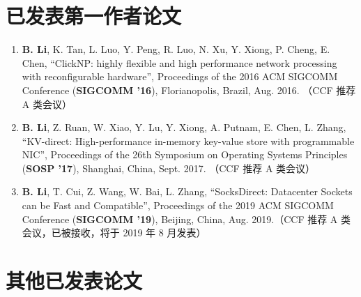 
\begin{publications}

\section*{已发表第一作者论文}

\begin{enumerate}
\item \textbf{B. Li}, K. Tan, L. Luo, Y. Peng, R. Luo, N. Xu, Y. Xiong, P. Cheng, E. Chen, ``ClickNP: highly flexible and high performance network processing with reconfigurable hardware'', Proceedings of the 2016 ACM SIGCOMM Conference (\textbf{SIGCOMM '16}), Florianopolis, Brazil, Aug. 2016. （CCF 推荐 A 类会议）
\item \textbf{B. Li}, Z. Ruan, W. Xiao, Y. Lu, Y. Xiong, A. Putnam, E. Chen, L. Zhang, ``KV-direct: High-performance in-memory key-value store with programmable NIC'', Proceedings of the 26th Symposium on Operating Systems Principles (\textbf{SOSP '17}), Shanghai, China, Sept. 2017. （CCF 推荐 A 类会议）
\item \textbf{B. Li}, T. Cui, Z. Wang, W. Bai, L. Zhang, ``SocksDirect: Datacenter Sockets can be Fast and Compatible'', Proceedings of the 2019 ACM SIGCOMM Conference (\textbf{SIGCOMM '19}), Beijing, China, Aug. 2019.（CCF 推荐 A 类会议，已被接收，将于 2019 年 8 月发表）
\end{enumerate}

\section*{其他已发表论文}


\end{publications}
